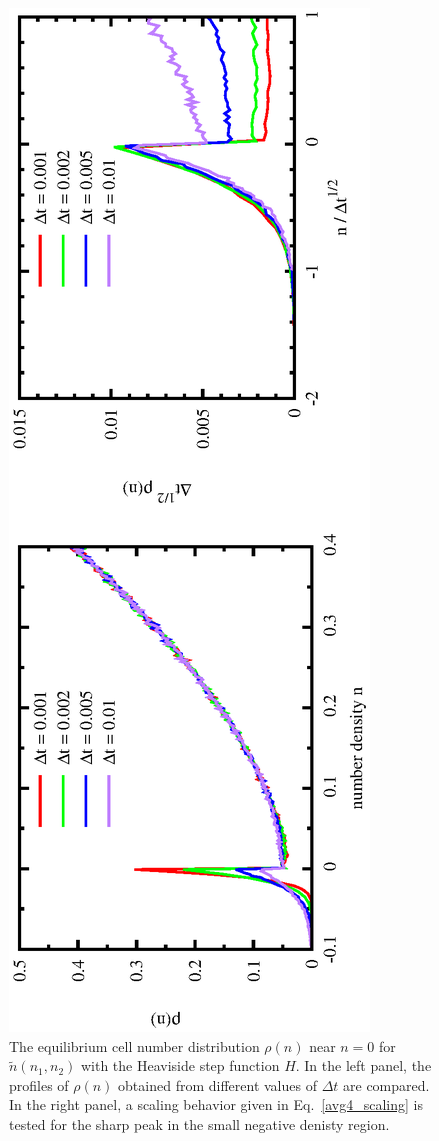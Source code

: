 \documentclass{article}
\begin{document}
\begin{figure}
\centering
\includegraphics[angle=270,width=\linewidth]{fig5/AVG4.eps}
\caption{\label{fig_avg4}The equilibrium cell number distribution $\rho(n)$ near $n=0$ for $\tilde{n}(n_1,n_2)$ with the Heaviside step function $H$. In the left panel, the profiles of $\rho(n)$ obtained from different values of $\Delta t$ are compared. In the right panel, a scaling behavior given in Eq.~\eqref{avg4_scaling} is tested for the sharp peak in the small negative denisty region.}
\end{figure}
\end{document}
